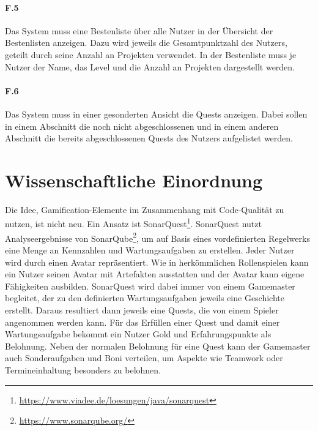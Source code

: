 \documentclass[
	oneside,  %
	ngerman, 
	final, 
	11pt, 
	a4paper, 
	1.1headlines, 
	headinclude=false, 
	footinclude=false, 
	mpinclude=false, 
	pagesize, 
	onecolumn, 
	titlepage, 
	parskip=half, 
	headsepline, 
	chapterprefix=false, 
	version=first, 
	listof=totoc, 
	bibliography=totoc, 
	toc=graduated, 
	fleqn
]{scrbook}
\begin{document}
\paragraph{F.5}
Das System muss eine Bestenliste über alle Nutzer in der Übersicht der Bestenlisten anzeigen.
Dazu wird jeweils die Gesamtpunktzahl des Nutzers, geteilt durch seine Anzahl an Projekten verwendet.
In der Bestenliste muss je Nutzer der Name, das Level und die Anzahl an Projekten dargestellt werden.

\paragraph{F.6}
Das System muss in einer gesonderten Ansicht die Quests anzeigen.
Dabei sollen in einem Abschnitt die noch nicht abgeschlossenen und in einem anderen Abschnitt die bereits abgeschlossenen Quests des Nutzers aufgelistet werden.

\section{Wissenschaftliche Einordnung}
\label{Wissenschaftliche_Einordnung}
Die Idee, Gamification-Elemente im Zusammenhang mit Code-Qualität zu nutzen, ist nicht neu.
Ein Ansatz ist SonarQuest\footnote{\url{https://www.viadee.de/loesungen/java/sonarquest}}.
SonarQuest nutzt Analyseergebnisse von SonarQube\footnote{\url{https://www.sonarqube.org/}}, um auf Basis eines vordefinierten Regelwerks eine Menge an Kennzahlen und Wartungsaufgaben zu erstellen.
Jeder Nutzer wird durch einen Avatar repräsentiert.
Wie in herkömmlichen Rollenspielen kann ein Nutzer seinen Avatar mit Artefakten ausstatten und der Avatar kann eigene Fähigkeiten ausbilden.
SonarQuest wird dabei immer von einem Gamemaster begleitet, der zu den definierten Wartungsaufgaben jeweils eine Geschichte erstellt.
Daraus resultiert dann jeweils eine Quests, die von einem Spieler angenommen werden kann.
Für das Erfüllen einer Quest und damit einer Wartungsaufgabe bekommt ein Nutzer Gold und Erfahrungspunkte als Belohnung. 
Neben der normalen Belohnung für eine Quest kann der Gamemaster auch Sonderaufgaben und Boni verteilen, um Aspekte wie Teamwork oder Termineinhaltung besonders zu belohnen.\cite{SonarQuest}
\end{document}
